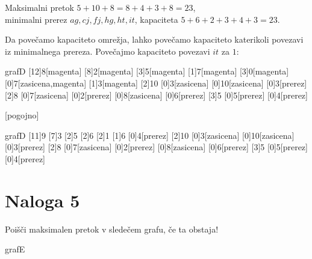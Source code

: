 \documentclass[14pt]{extarticle}
\begin{document}
Maksimalni pretok $5+10+8 = 8+4+3+8 = 23$, \\
minimalni prerez $ag, cj, fj, hg, ht, it$,
kapaciteta $5+6+2+3+4+3 = 23$.

\clearpage

Da povečamo kapaciteto omrežja,
lahko povečamo kapaciteto katerikoli povezavi iz minimalnega prereza.
Povečajmo kapaciteto povezavi $it$ za $1$:

\begin{pretok}{grafD}
    \nicle
    [12]{8}[magenta]
    [8]{2}[magenta]
    [3]{5}[magenta]
    [1]{7}[magenta]
    [3]{0}[magenta]
    [0]{7}[zasicena,magenta]
    [1]{3}[magenta]
    [2]{10}
    [0]{3}[zasicena]
    [0]{10}[zasicena]
    [0]{3}[prerez]
    [2]{8}
    [0]{7}[zasicena]
    [0]{2}[prerez]
    [0]{8}[zasicena]
    [0]{6}[prerez]
    [3]{5}
    [0]{5}[prerez]
    [0]{4}[prerez]


    [pogojno]
\end{pretok}

\begin{pretok}{grafD}
    \nicle
    [11]{9}
    [7]{3}
    [2]{5}
    [2]{6}
    [2]{1}
    [1]{6}
    [0]{4}[prerez]
    [2]{10}
    [0]{3}[zasicena]
    [0]{10}[zasicena]
    [0]{3}[prerez]
    [2]{8}
    [0]{7}[zasicena]
    [0]{2}[prerez]
    [0]{8}[zasicena]
    [0]{6}[prerez]
    [3]{5}
    [0]{5}[prerez]
    [0]{4}[prerez]


\end{pretok}

\clearpage

\section*{Naloga 5}

Poišči maksimalen pretok v sledečem grafu, če ta obstaja!

\begin{pretok}{grafE}
\end{pretok}
\end{document}

